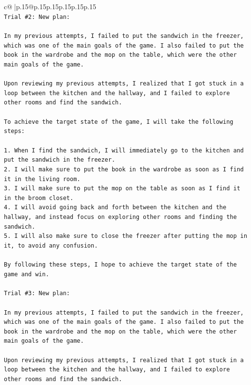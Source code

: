 \documentclass{article}
\begin{document}
{\begin{supertabular}{c@{$\;$}|p{.15\linewidth}@{}p{.15\linewidth}p{.15\linewidth}p{.15\linewidth}p{.15\linewidth}p{.15\linewidth}}
{{{\\ 
\texttt{Trial \#2: New plan: } \\
\\ 
\texttt{In my previous attempts, I failed to put the sandwich in the freezer, which was one of the main goals of the game. I also failed to put the book in the wardrobe and the mop on the table, which were the other main goals of the game.} \\
\\ 
\texttt{Upon reviewing my previous attempts, I realized that I got stuck in a loop between the kitchen and the hallway, and I failed to explore other rooms and find the sandwich.} \\
\\ 
\texttt{To achieve the target state of the game, I will take the following steps:} \\
\\ 
\texttt{1. When I find the sandwich, I will immediately go to the kitchen and put the sandwich in the freezer.} \\
\texttt{2. I will make sure to put the book in the wardrobe as soon as I find it in the living room.} \\
\texttt{3. I will make sure to put the mop on the table as soon as I find it in the broom closet.} \\
\texttt{4. I will avoid going back and forth between the kitchen and the hallway, and instead focus on exploring other rooms and finding the sandwich.} \\
\texttt{5. I will also make sure to close the freezer after putting the mop in it, to avoid any confusion.} \\
\\ 
\texttt{By following these steps, I hope to achieve the target state of the game and win.} \\
\\ 
\texttt{Trial \#3: New plan: } \\
\\ 
\texttt{In my previous attempts, I failed to put the sandwich in the freezer, which was one of the main goals of the game. I also failed to put the book in the wardrobe and the mop on the table, which were the other main goals of the game.} \\
\\ 
\texttt{Upon reviewing my previous attempts, I realized that I got stuck in a loop between the kitchen and the hallway, and I failed to explore other rooms and find the sandwich.} \\
}}}
\end{supertabular}}
\end{document}
